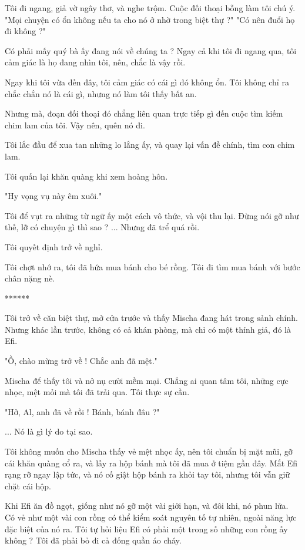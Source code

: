  Tôi đi ngang, giả vờ ngây thơ, và nghe trộm. Cuộc đối thoại bỗng làm tôi chú ý. "Mọi chuyện có ổn không nếu ta cho nó ở nhờ trong biệt thự ?" "Có nên đuổi họ đi không ?"
 
 Có phải mấy quý bà ấy đang nói về chúng ta ? Ngay cả khi tôi đi ngang qua, tôi cảm giác là họ đang nhìn tôi, nên, chắc là vậy rồi.
 
 Ngay khi tôi vừa đến đây, tôi cảm giác có cái gì đó không ổn. Tôi không chỉ ra chắc chắn nó là cái gì, nhưng nó làm tôi thấy bất an.
 
 Nhưng mà, đoạn đối thoại đó chẳng liên quan trực tiếp gì đến cuộc tìm kiếm chim lam của tôi. Vậy nên, quên nó đi.
 
 Tôi lắc đầu để xua tan những lo lắng ấy, và quay lại vấn đề chính, tìm con chim lam.
 
 Tôi quấn lại khăn quàng khi xem hoàng hôn.
 
 "Hy vọng vụ này êm xuôi."
 
 Tôi để vụt ra những từ ngữ ấy một cách vô thức, và vội thu lại. Đừng nói gỡ như thế, lỡ có chuyện gì thì sao ? ... Nhưng đã trể quá rồi.
 
 Tôi quyết định trở về nghỉ.
 
 Tôi chợt nhớ ra, tôi đã hứa mua bánh cho bé rồng. Tôi đi tìm mua bánh với bước chân nặng nè.\\
 
  \begin{center}
 	******
 \end{center}
 
 Tôi trở về căn biệt thự, mở cửa trước và thấy Mischa đang hát trong sảnh chính. Nhưng khác lần trước, không có cả khán phòng, mà chỉ có một thính giả, đó là Efi.
 
 "Ồ, chào mừng trở về ! Chắc anh đã mệt."
 
 Mischa để thấy tôi và nở nụ cười mềm mại. Chẳng ai quan tâm tôi, những cực nhọc, mệt mỏi mà tôi đã trải qua. Tôi thực sự cần.
 
 "Hở, Al, anh đã về rồi ! Bánh, bánh đâu ?"
 
 ... Nó là gì lý do tại sao.
 
 Tôi không muốn cho Mischa thấy vẻ mệt nhọc ấy, nên tôi chuẩn bị mặt mũi, gỡ cái khăn quàng cổ ra, và lấy ra hộp bánh mà tôi đã mua ở tiệm gần đây. Mắt Efi rạng rỡ ngay lập tức, và nó cố giật hộp bánh ra khỏi tay tôi, nhưng tôi vẫn giữ chặt cái hộp.
 
 Khi Efi ăn đồ ngọt, giống như nó gỡ một vài giới hạn, và đôi khi, nó phun lửa. Có vẻ như một vài con rồng có thể kiểm soát nguyên tố tự nhiên, ngoài năng lực đặc biệt
 của nó ra. Tôi tự hỏi liệu Efi có phải một trong số những con rồng ấy không ? Tôi đã phải bỏ đi cả đống quần áo cháy.
 
